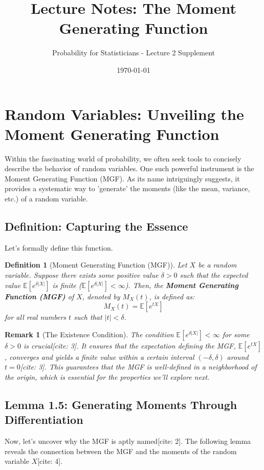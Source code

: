\documentclass[12pt]{article}
\title{Lecture Notes: The Moment Generating Function}
\author{Probability for Statisticians - Lecture 2 Supplement}
\date{\today}
\newtheorem{definition}[theorem]{Definition}
\newtheorem{remark}[theorem]{Remark}
\begin{document}
\maketitle

\section{Random Variables: Unveiling the Moment Generating Function}

Within the fascinating world of probability, we often seek tools to concisely describe the behavior of random variables. One such powerful instrument is the Moment Generating Function (MGF). As its name intriguingly suggests, it provides a systematic way to 'generate' the moments (like the mean, variance, etc.) of a random variable.

\subsection{Definition: Capturing the Essence}

Let's formally define this function.

\begin{definition}[Moment Generating Function (MGF)]
Let $X$ be a random variable. Suppose there exists some positive value $\delta > 0$ such that the expected value $\mathbb{E}[e^{\delta|X|}]$ is finite ($\mathbb{E}[e^{\delta|X|}] < \infty$). Then, the \textbf{Moment Generating Function (MGF)} of $X$, denoted by $M_X(t)$, is defined as:
\[
M_X(t) = \mathbb{E}[e^{tX}]
\]
for all real numbers $t$ such that $|t| < \delta$.
\end{definition}

\begin{remark}[The Existence Condition]
The condition $\mathbb{E}[e^{\delta|X|}] < \infty$ for some $\delta > 0$ is crucial[cite: 3]. It ensures that the expectation defining the MGF, $\mathbb{E}[e^{tX}]$, converges and yields a finite value within a certain interval $(-\delta, \delta)$ around $t=0$[cite: 3]. This guarantees that the MGF is well-defined in a neighborhood of the origin, which is essential for the properties we'll explore next.
\end{remark}

\subsection{Lemma 1.5: Generating Moments Through Differentiation}

Now, let's uncover why the MGF is aptly named[cite: 2]. The following lemma reveals the connection between the MGF and the moments of the random variable $X$[cite: 4].
\end{document}
